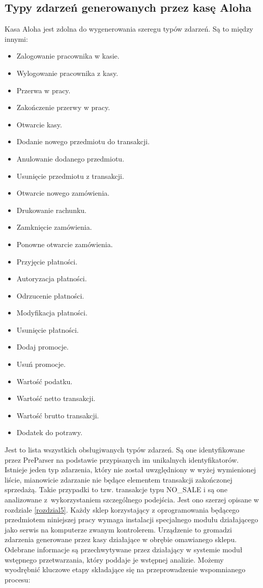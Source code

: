 \documentclass[a4paper]{book}
\begin{document}
\subsection{Typy zdarzeń generowanych przez kasę Aloha}
Kasa Aloha jest zdolna do wygenerowania szeregu typów zdarzeń. Są to między innymi:
\begin{itemize}
	\setlength\itemsep{0.1pt}
	\item Zalogowanie pracownika w kasie.
	\item Wylogowanie pracownika z kasy.
	\item Przerwa w pracy.
	\item Zakończenie przerwy w pracy.
	\item Otwarcie kasy.
	\item Dodanie nowego przedmiotu do transakcji.
	\item Anulowanie dodanego przedmiotu.
	\item Usunięcie przedmiotu z transakcji.
	\item Otwarcie nowego zamówienia.
	\item Drukowanie rachunku.
	\item Zamknięcie zamówienia.
	\item Ponowne otwarcie zamówienia.
	\item Przyjęcie płatności.
	\item Autoryzacja płatności.
	\item Odrzucenie płatności.
	\item Modyfikacja płatności.
	\item Usunięcie płatności.
	\item Dodaj promocje.
	\item Usuń promocje.
	\item Wartość podatku.
	\item Wartość netto transakcji.
	\item Wartość brutto transakcji.
	\item Dodatek do potrawy.
\end{itemize}
Jest to lista wszystkich obsługiwanych typów zdarzeń. Są one identyfikowane przez PreParser na podstawie przypisanych im unikalnych identyfikatorów. Istnieje  jeden typ zdarzenia, który nie został uwzględniony w wyżej wymienionej liście, mianowicie zdarzanie nie będące elementem transakcji zakończonej sprzedażą. Takie przypadki to tzw. transakcje typu NO\_SALE i są  one analizowane z~wykorzystaniem szczególnego podejścia. Jest ono szerzej opisane w rozdziale \ref{rozdzial5}.
Każdy sklep korzystający z oprogramowania będącego przedmiotem niniejszej pracy wymaga instalacji specjalnego modułu działającego jako serwis na komputerze zwanym kontrolerem. Urządzenie to gromadzi zdarzenia generowane przez kasy działające w obrębie omawianego sklepu. Odebrane informacje są przechwytywane przez działający w systemie moduł wstępnego przetwarzania, który poddaje je wstępnej analizie. Możemy wyodrębnić kluczowe etapy składające się na przeprowadzenie wspomnianego procesu:
\end{document}
